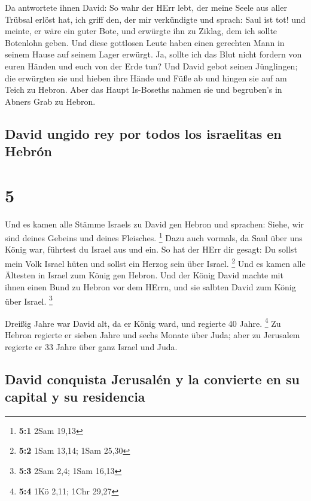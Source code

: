  Da antwortete ihnen David: So wahr der HErr lebt, der
meine Seele aus aller Trübsal erlöst hat,  ich griff den,
der mir verkündigte und sprach: Saul ist tot! und meinte, er wäre ein
guter Bote, und erwürgte ihn zu Ziklag, dem ich sollte Botenlohn geben.
 Und diese gottlosen Leute haben einen gerechten Mann in
seinem Hause auf seinem Lager erwürgt. Ja, sollte ich das Blut nicht
fordern von euren Händen und euch von der Erde tun?  Und
David gebot seinen Jünglingen; die erwürgten sie und hieben ihre Hände
und Füße ab und hingen sie auf am Teich zu Hebron. Aber das Haupt
Is-Boseths nahmen sie und begruben's in Abners Grab zu Hebron.

\hypertarget{david-ungido-rey-por-todos-los-israelitas-en-hebruxf3n}{%
\subsection{David ungido rey por todos los israelitas en
Hebrón}\label{david-ungido-rey-por-todos-los-israelitas-en-hebruxf3n}}

\hypertarget{section-4}{%
\section{5}\label{section-4}}

 Und es kamen alle Stämme Israels zu David gen Hebron und
sprachen: Siehe, wir sind deines Gebeins und deines Fleisches.
\footnote{\textbf{5:1} 2Sam 19,13}  Dazu auch vormals, da
Saul über uns König war, führtest du Israel aus und ein. So hat der HErr
dir gesagt: Du sollst mein Volk Israel hüten und sollst ein Herzog sein
über Israel. \footnote{\textbf{5:2} 1Sam 13,14; 1Sam 25,30}
 Und es kamen alle Ältesten in Israel zum König gen
Hebron. Und der König David machte mit ihnen einen Bund zu Hebron vor
dem HErrn, und sie salbten David zum König über Israel. \footnote{\textbf{5:3}
  2Sam 2,4; 1Sam 16,13}

 Dreißig Jahre war David alt, da er König ward, und
regierte 40 Jahre. \footnote{\textbf{5:4} 1Kö 2,11; 1Chr 29,27}
 Zu Hebron regierte er sieben Jahre und sechs Monate über
Juda; aber zu Jerusalem regierte er 33 Jahre über ganz Israel und Juda.

\hypertarget{david-conquista-jerusaluxe9n-y-la-convierte-en-su-capital-y-su-residencia}{%
\subsection{David conquista Jerusalén y la convierte en su capital y su
residencia}\label{david-conquista-jerusaluxe9n-y-la-convierte-en-su-capital-y-su-residencia}}

